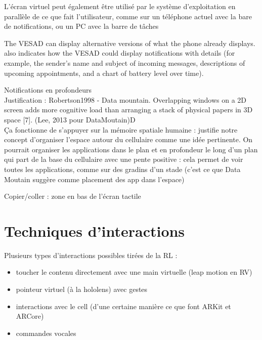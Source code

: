 
L'écran virtuel peut également être utilisé par le système d'exploitation en parallèle de ce que fait l'utilisateur, comme sur un téléphone actuel avec la bare de notifications, ou un PC avec la barre de tâches

The VESAD can display alternative versions of what the phone already displays.  also indicates how the VESAD could display notifications with details (for example, the sender's name and subject of incoming messages,
descriptions of upcoming appointments, and a chart of battery level over time).

Notifications en profondeurs\\
Justification : Robertson1998 - Data mountain. Overlapping windows on a 2D screen adds more cognitive load than arranging a stack of physical papers in  3D space [7]. (Lee, 2013 pour DataMoutain)D\\
Ça fonctionne de s'appuyer sur la mémoire spatiale humaine : justifie notre concept d'organiser l'espace autour du cellulaire comme une idée pertinente. On pourrait organiser les applications dans le plan et en profondeur le long d'un plan qui part de la base du cellulaire avec une pente positive : cela permet de voir toutes les applications, comme sur des gradins d'un stade (c'est ce que Data Moutain suggère comme placement des app dans l'espace)

Copier/coller : zone en bas de l'écran tactile


\section{Techniques d'interactions}
\label{sec:concept_interaction_techniques}

Plusieurs types d'interactions possibles tirées de la RL :
\begin{itemize}
  \item toucher le contenu directement avec une main virtuelle (leap motion en RV)
  \item pointeur virtuel (à la hololens) avec gestes
  \item interactions avec le cell (d'une certaine manière ce que font ARKit et ARCore)
  \item commandes vocales
\end{itemize}

